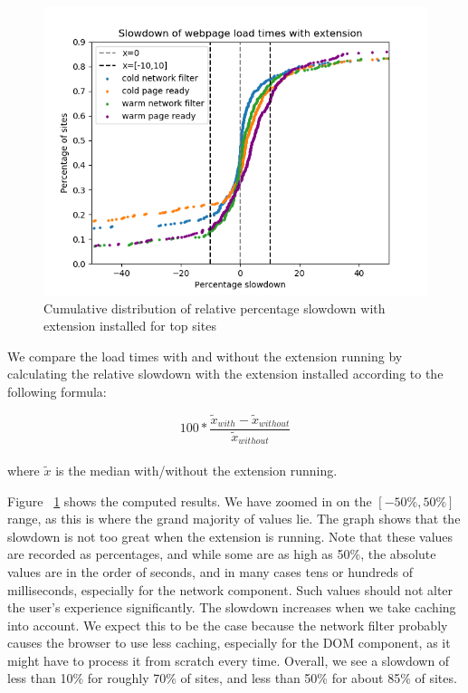 \begin{figure}[h]
	\includegraphics[scale=0.5]{results/extension_slowdown_overall}
	\caption{Cumulative distribution of relative percentage slowdown with extension installed for top sites}
	\label{fig:overall_slowdown}
\end{figure}

We compare the load times with and without the extension running by calculating the relative slowdown with the extension installed according to the following formula: 

\begin{equation*}
100*\frac{\tilde{x}_{with}-\tilde{x}_{without}}{\tilde{x}_{without}}
\end{equation*}
\\
where $\tilde{x}$ is the median with/without the extension running.

Figure ~\ref{fig:overall_slowdown} shows the computed results. We have zoomed in on the $[-50\%,50\%]$ range, as this is where the grand majority of values lie. The graph shows that the slowdown is not too great when the extension is running. Note that these values are recorded as percentages, and while some are as high as 50\%, the absolute values are in the order of seconds, and in many cases tens or hundreds of milliseconds, especially for the network component. Such values should not alter the user's experience significantly. The slowdown increases when we take caching into account. We expect this to be the case because the network filter probably causes the browser to use less caching, especially for the DOM component, as it might have to process it from scratch every time. Overall, we see a slowdown of less than 10\% for roughly 70\% of sites, and less than 50\% for about 85\% of sites.

